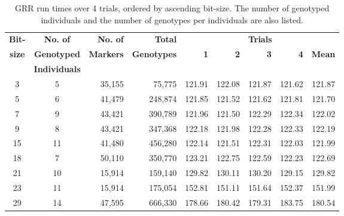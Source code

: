 \begin{table}[h]
\begin{center}
\begin{tabular}{ccrrrrrrr} \toprule
\textbf{Bit-} & \textbf{No. of}     &  \textbf{No. of}  & \textbf{Total}      & \multicolumn{5}{c}{\textbf{Trials}}              \\
\textbf{size} & \textbf{Genotyped} & \textbf{Markers} & \textbf{Genotypes} & \textbf{1}&\textbf{2}&\textbf{3}&\textbf{4}& \textbf{Mean}\\
              & \textbf{Individuals}                  &               &                  &         &       &        &        &        \\
\midrule
3        & 5                            & 35,155         & 75,775          & 121.91 & 122.08 & 121.87 & 121.62 & 121.87 \\
5        & 6                            & 41,479         & 248,874         & 121.85 & 121.52 & 121.62 & 121.81 & 121.70 \\
7        & 9                            & 43,421         & 390,789         & 121.96 & 121.50 & 122.29 & 122.34 & 122.02 \\
9        & 8                            & 43,421         & 347,368         & 122.18 & 121.98 & 122.28 & 122.33 & 122.19 \\
15       & 11                           & 41,480         & 456,280         & 122.14 & 121.51 & 122.31 & 122.03 & 121.99 \\
18       & 7                            & 50,110         & 350,770         & 123.21 & 122.75 & 122.59 & 122.23 & 122.69 \\
21       & 10                           & 15,914         & 159,140         & 129.82 & 130.11 & 130.20 & 129.15 & 129.82 \\
23       & 11                           & 15,914         & 175,054         & 152.81 & 151.11 & 151.64 & 152.37 & 151.99 \\
29       & 14                           & 47,595         & 666,330         & 178.66 & 180.42 & 179.31 & 183.75 & 180.54 \\
\hline
\end{tabular}
\end{center}
\vspace{-15pt}
\caption{GRR run times over 4 trials, ordered by ascending bit-size. The number of genotyped individuals and the number of genotypes per individuals are also listed.}\label{table:res:grrtimes}
\end{table}

